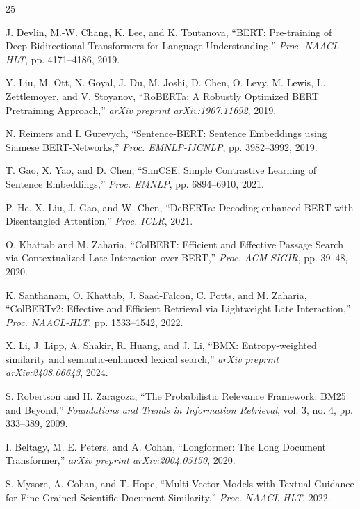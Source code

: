 \documentclass[conference,onecolumn,11pt]{IEEEtran}
\begin{document}
\begin{thebibliography}{25}

J. Devlin, M.-W. Chang, K. Lee, and K. Toutanova, ``BERT: Pre-training of Deep Bidirectional Transformers for Language Understanding,'' \textit{Proc. NAACL-HLT}, pp. 4171--4186, 2019.

Y. Liu, M. Ott, N. Goyal, J. Du, M. Joshi, D. Chen, O. Levy, M. Lewis, L. Zettlemoyer, and V. Stoyanov, ``RoBERTa: A Robustly Optimized BERT Pretraining Approach,'' \textit{arXiv preprint arXiv:1907.11692}, 2019.

N. Reimers and I. Gurevych, ``Sentence-BERT: Sentence Embeddings using Siamese BERT-Networks,'' \textit{Proc. EMNLP-IJCNLP}, pp. 3982--3992, 2019.

T. Gao, X. Yao, and D. Chen, ``SimCSE: Simple Contrastive Learning of Sentence Embeddings,'' \textit{Proc. EMNLP}, pp. 6894--6910, 2021.

P. He, X. Liu, J. Gao, and W. Chen, ``DeBERTa: Decoding-enhanced BERT with Disentangled Attention,'' \textit{Proc. ICLR}, 2021.

O. Khattab and M. Zaharia, ``ColBERT: Efficient and Effective Passage Search via Contextualized Late Interaction over BERT,'' \textit{Proc. ACM SIGIR}, pp. 39--48, 2020.

K. Santhanam, O. Khattab, J. Saad-Falcon, C. Potts, and M. Zaharia, ``ColBERTv2: Effective and Efficient Retrieval via Lightweight Late Interaction,'' \textit{Proc. NAACL-HLT}, pp. 1533--1542, 2022.

X. Li, J. Lipp, A. Shakir, R. Huang, and J. Li, ``BMX: Entropy-weighted similarity and semantic-enhanced lexical search,'' \textit{arXiv preprint arXiv:2408.06643}, 2024.

S. Robertson and H. Zaragoza, ``The Probabilistic Relevance Framework: BM25 and Beyond,'' \textit{Foundations and Trends in Information Retrieval}, vol. 3, no. 4, pp. 333--389, 2009.

I. Beltagy, M. E. Peters, and A. Cohan, ``Longformer: The Long Document Transformer,'' \textit{arXiv preprint arXiv:2004.05150}, 2020.

S. Mysore, A. Cohan, and T. Hope, ``Multi-Vector Models with Textual Guidance for Fine-Grained Scientific Document Similarity,'' \textit{Proc. NAACL-HLT}, 2022.


\end{thebibliography}
\end{document}
